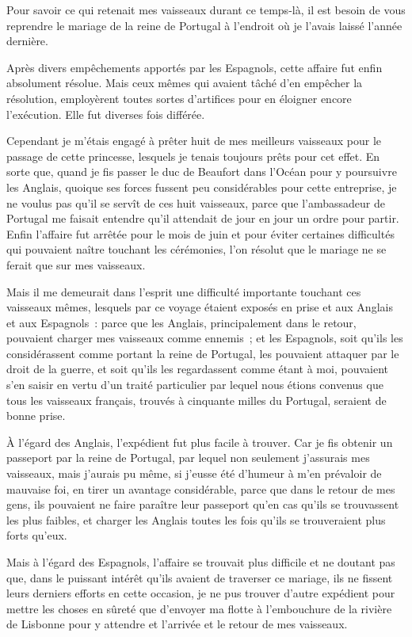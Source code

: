 \documentclass[french,twoside]{book} %
\begin{document}
Pour savoir ce qui retenait mes vaisseaux durant ce temps-là, il est besoin de vous reprendre le mariage de la reine de Portugal à l’endroit où je l’avais laissé l’année dernière.\par
Après divers empêchements apportés par les Espagnols, cette affaire fut enfin absolument résolue. Mais ceux mêmes qui avaient tâché d’en empêcher la résolution, employèrent toutes sortes d’artifices pour en éloigner encore l’exécution. Elle fut diverses fois différée.\par
Cependant je m’étais engagé à prêter huit de mes meilleurs vaisseaux pour le passage de cette princesse, lesquels je tenais toujours prêts pour cet effet. En sorte que, quand je fis passer le duc de Beaufort dans l’Océan pour y poursuivre les Anglais, quoique ses forces fussent peu considérables pour cette entreprise, je ne voulus pas qu’il se servît de ces huit vaisseaux, parce que l’ambassadeur de Portugal me faisait entendre qu’il attendait de jour en jour un ordre pour partir. Enfin l’affaire fut arrêtée pour le mois de juin et pour éviter certaines difficultés qui pouvaient naître touchant les cérémonies, l’on résolut que le mariage ne se ferait que sur mes vaisseaux.\par
Mais il me demeurait dans l’esprit une difficulté importante touchant ces vaisseaux mêmes, lesquels par ce voyage étaient exposés en prise et aux Anglais et aux Espagnols : parce que les Anglais, principalement dans le retour, pouvaient charger mes vaisseaux comme ennemis ; et les Espagnols, soit qu’ils les considérassent comme portant la reine de Portugal, les pouvaient attaquer par le droit de la guerre, et soit qu’ils les regardassent comme étant à moi, pouvaient s’en saisir en vertu d’un traité particulier par lequel nous étions convenus que tous les vaisseaux français, trouvés à cinquante milles du Portugal, seraient de bonne prise.\par
À l’égard des Anglais, l’expédient fut plus facile à trouver. Car je fis obtenir un passeport par la reine de Portugal, par lequel non seulement j’assurais mes vaisseaux, mais j’aurais pu même, si j’eusse été d’humeur à m’en prévaloir de mauvaise foi, en tirer un avantage considérable, parce que dans le retour de mes gens, ils pouvaient ne faire paraître leur passeport qu’en cas qu’ils se trouvassent les plus faibles, et charger les Anglais toutes les fois qu’ils se trouveraient plus forts qu’eux.\par
Mais à l’égard des Espagnols, l’affaire se trouvait plus difficile et ne doutant pas que, dans le puissant intérêt qu’ils avaient de traverser ce mariage, ils ne fissent leurs derniers efforts en cette occasion, je ne pus trouver d’autre expédient pour mettre les choses en sûreté que d’envoyer ma flotte à l’embouchure de la rivière de Lisbonne pour y attendre et l’arrivée et le retour de mes vaisseaux.\par
\end{document}
